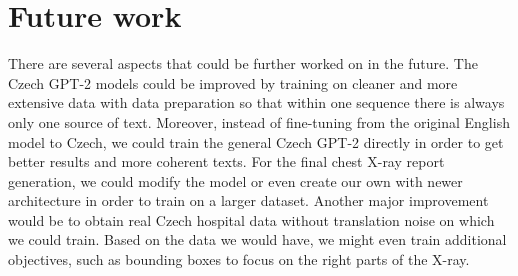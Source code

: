 \section*{Future work}
There are several aspects that could be further worked on in the future. The Czech GPT-2 models could be improved by training on cleaner and more extensive data with data preparation so that within one sequence there is always only one source of text. Moreover, instead of fine-tuning from the original English model to Czech, we could train the general Czech GPT-2 directly in order to get better results and more coherent texts. For the final chest X-ray report generation, we could modify the model or even create our own with newer architecture in order to train on a larger dataset. Another major improvement would be to obtain real Czech hospital data without translation noise on which we could train. Based on the data we would have, we might even train additional objectives, such as bounding boxes to focus on the right parts of the X-ray.